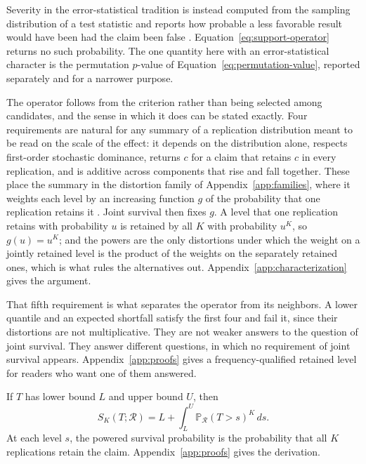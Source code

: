 \documentclass[11pt]{article}
\newcommand{\Regime}{\mathcal{R}}
\newcommand{\Prb}{\mathbb{P}}
\theoremstyle{remark}
\begin{document}
Severity in the error-statistical tradition is instead computed from the sampling distribution of a test statistic and reports how probable a less favorable result would have been had the claim been false \cite{mayo1996error}. Equation~\eqref{eq:support-operator} returns no such probability. The one quantity here with an error-statistical character is the permutation $p$-value of Equation~\eqref{eq:permutation-value}, reported separately and for a narrower purpose.

The operator follows from the criterion rather than being selected among candidates, and the sense in which it does can be stated exactly. Four requirements are natural for any summary of a replication distribution meant to be read on the scale of the effect: it depends on the distribution alone, respects first-order stochastic dominance, returns $c$ for a claim that retains $c$ in every replication, and is additive across components that rise and fall together. These place the summary in the distortion family of Appendix~\ref{app:families}, where it weights each level by an increasing function $g$ of the probability that one replication retains it \cite{schmeidler1986integral,yaari1987dual}. Joint survival then fixes $g$. A level that one replication retains with probability $u$ is retained by all $K$ with probability $u^K$, so $g(u)=u^K$; and the powers are the only distortions under which the weight on a jointly retained level is the product of the weights on the separately retained ones, which is what rules the alternatives out. Appendix~\ref{app:characterization} gives the argument.

That fifth requirement is what separates the operator from its neighbors. A lower quantile and an expected shortfall satisfy the first four and fail it, since their distortions are not multiplicative. They are not weaker answers to the question of joint survival. They answer different questions, in which no requirement of joint survival appears. Appendix~\ref{app:proofs} gives a frequency-qualified retained level for readers who want one of them answered.

If $T$ has lower bound $L$ and upper bound $U$, then
\begin{equation}
S_K(T;\Regime)
=
L+\int_L^U
\Prb_{\Regime}(T>s)^K\,ds.
\label{eq:support-survival}
\end{equation}
At each level $s$, the powered survival probability is the probability that all $K$ replications retain the claim. Appendix~\ref{app:proofs} gives the derivation.
\end{document}

